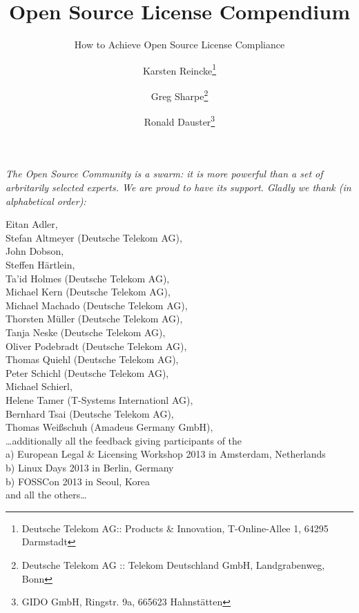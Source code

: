 \documentclass[DIV=calc,BCOR=5mm,12pt,headings=small,oneside,toc=bib]{scrbook}
\begin{document}
\nocite{*}

\titlehead{Version  %
}

\subject{\small \itshape A Practical Guide for Developers, Managers, OS Experts, 
and Companies} 

\title{Open Source License Compendium}

\subtitle{How to Achieve Open Source License Compliance}
\author{
Karsten Reincke\thanks{Deutsche Telekom AG:: Products \& Innovation, 
T-Online-Allee 1, 64295 Darmstadt}
\and
Greg Sharpe\thanks{Deutsche Telekom AG :: Telekom Deutschland GmbH, 
Landgrabenweg, Bonn}
\and
Ronald Dauster\thanks{GIDO GmbH, Ringstr. 9a, 665623 Hahnstätten}}

\maketitle

\footnotesize
\begin{flushright} 

\parbox{100mm}{\itshape
The Open Source Community is a swarm: it is more powerful than a set of
arbritarily selected experts. We are proud to have its support. Gladly we thank
(in alphabetical order):
}

\parbox{100mm}{
\tiny
\begin{flushright}
Eitan Adler,\\
Stefan Altmeyer (Deutsche Telekom AG),\\
John Dobson, \\
Steffen Härtlein, \\
Ta'id Holmes (Deutsche Telekom AG), \\
Michael Kern (Deutsche Telekom AG),\\
Michael Machado (Deutsche Telekom AG),\\
Thorsten Müller (Deutsche Telekom AG),\\
Tanja Neske (Deutsche Telekom AG),\\
Oliver Podebradt (Deutsche Telekom AG),\\
Thomas Quiehl (Deutsche Telekom AG),\\
Peter Schichl (Deutsche Telekom AG),\\
Michael Schierl,\\
Helene Tamer (T-Systems Internationl AG),\\
Bernhard Tsai (Deutsche Telekom AG),\\
Thomas Weißschuh (Amadeus Germany GmbH),\\
\ldots additionally all the feedback giving participants of the \\
a) European Legal \& Licensing Workshop 2013 in Amsterdam, Netherlands\\
b) Linux Days 2013 in Berlin, Germany\\
b) FOSSCon 2013 in Seoul, Korea\\
and all the others\ldots
\end{flushright}
}
\end{flushright}
\normalsize
\newpage
\end{document}
